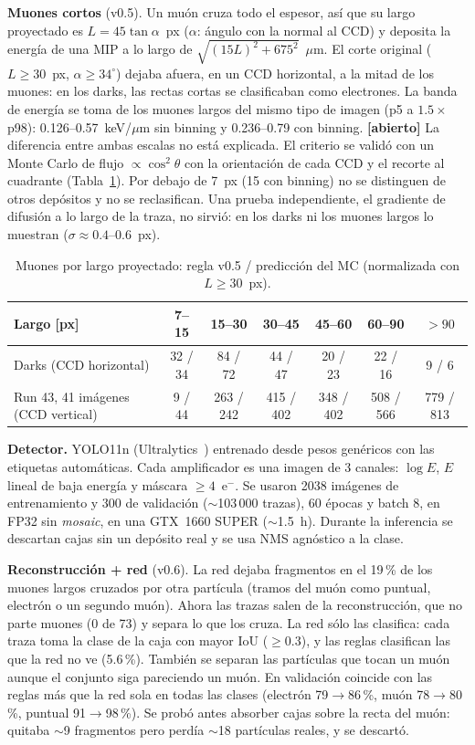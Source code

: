 \documentclass[10pt,a4paper]{article}
\newcommand{\eminus}{e$^-$}
\newcommand{\abierto}[1]{\textcolor{orange!80!black}{\textbf{[abierto]} #1}}
\begin{document}
\textbf{Muones cortos} (v0.5). Un muón cruza todo el espesor, así que su largo proyectado es
$L = 45\tan\alpha$~px ($\alpha$: ángulo con la normal al CCD) y deposita la energía de una MIP a lo largo de
$\sqrt{(15L)^2+675^2}$~$\mu$m. El corte original ($L\geq30$~px, $\alpha\geq34^\circ$) dejaba afuera, en un CCD
horizontal, a la mitad de los muones: en los darks, las rectas cortas se clasificaban como electrones. La banda
de energía se toma de los muones largos del mismo tipo de imagen (p5 a $1.5\times$p98): 0.126--0.57~keV/$\mu$m
sin binning y 0.236--0.79 con binning. \abierto{La diferencia entre ambas escalas no está explicada.}
El criterio se validó con un Monte Carlo de flujo $\propto\cos^2\theta$ con la orientación de cada CCD y el
recorte al cuadrante (Tabla~\ref{tab:cortos}). Por debajo de 7~px (15 con binning) no se distinguen de otros
depósitos y no se reclasifican. Una prueba independiente, el gradiente de difusión a lo largo de la traza, no
sirvió: en los darks ni los muones largos lo muestran ($\sigma\approx0.4$--0.6~px).

\begin{table}[h]
\centering\small
\caption{Muones por largo proyectado: regla v0.5 / predicción del MC (normalizada con $L\geq30$~px).}
\label{tab:cortos}
\begin{tabular}{@{}lcccccc@{}}
\toprule
Largo [px] & 7--15 & 15--30 & 30--45 & 45--60 & 60--90 & $>90$ \\
\midrule
Darks (CCD horizontal) & 32 / 34 & 84 / 72 & 44 / 47 & 20 / 23 & 22 / 16 & 9 / 6 \\
Run 43, 41 imágenes (CCD vertical) & 9 / 44 & 263 / 242 & 415 / 402 & 348 / 402 & 508 / 566 & 779 / 813 \\
\bottomrule
\end{tabular}
\end{table}

\textbf{Detector.} YOLO11n (Ultralytics~\cite{yolo11}) entrenado desde pesos genéricos con las etiquetas
automáticas. Cada amplificador es una imagen de 3 canales: $\log E$, $E$ lineal de baja energía y máscara
$\geq 4$~\eminus. Se usaron 2038 imágenes de entrenamiento y 300 de validación ($\sim$103\,000 trazas),
60 épocas y batch 8, en FP32 sin \emph{mosaic}, en una GTX~1660 SUPER ($\sim$1.5~h). Durante la inferencia
se descartan cajas sin un depósito real y se usa NMS agnóstico a la clase.

\textbf{Reconstrucción + red} (v0.6). La red dejaba fragmentos en el 19\,\% de los muones largos cruzados por
otra partícula (tramos del muón como puntual, electrón o un segundo muón). Ahora las trazas salen de la
reconstrucción, que no parte muones (0 de 73) y separa lo que los cruza. La red sólo las clasifica: cada traza
toma la clase de la caja con mayor IoU ($\geq0.3$), y las reglas clasifican las que la red no ve
(5.6\,\%). También se separan las partículas que tocan un muón aunque el conjunto siga pareciendo un muón.
En validación coincide con las reglas más que la red sola en todas las clases (electrón 79$\to$86\,\%,
muón 78$\to$80\,\%, puntual 91$\to$98\,\%). Se probó antes absorber cajas sobre la recta del muón: quitaba
$\sim$9 fragmentos pero perdía $\sim$18 partículas reales, y se descartó.
\end{document}
